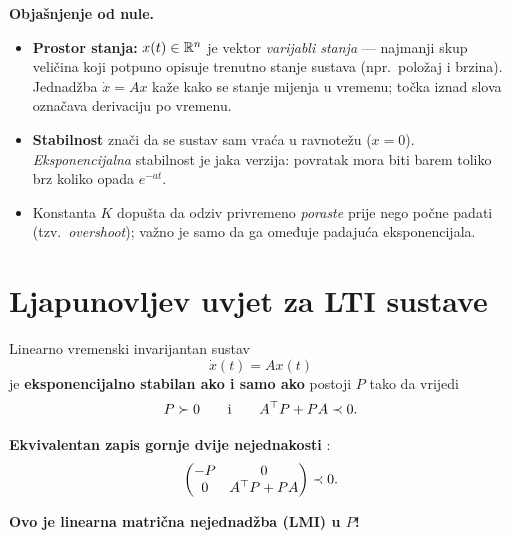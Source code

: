 \textbf{Objašnjenje od nule.}

\begin{itemize}
  \item \textbf{Prostor stanja:} $x(t) \in \mathbb{R}^n$ je vektor \emph{varijabli
        stanja} --- najmanji skup veličina koji potpuno opisuje trenutno stanje
        sustava (npr.\ položaj i brzina). Jednadžba $\dot x = Ax$ kaže kako se
        stanje mijenja u vremenu; točka iznad slova označava derivaciju po
        vremenu.
  \item \textbf{Stabilnost} znači da se sustav sam vraća u ravnotežu
        ($x = 0$). \emph{Eksponencijalna} stabilnost je jaka verzija: povratak
        mora biti barem toliko brz koliko opada $e^{-at}$.
  \item Konstanta $K$ dopušta da odziv privremeno \emph{poraste} prije nego
        počne padati (tzv.\ \emph{overshoot}); važno je samo da ga omeđuje
        padajuća eksponencijala.
\end{itemize}

\section{Ljapunovljev uvjet za LTI sustave}
\label{sec:ljapunov}

\begin{teorem}
Linearno vremenski invarijantan sustav
\[
\dot x(t) = Ax(t)
\]
je \textbf{eksponencijalno stabilan ako i samo ako} postoji $P$ tako da vrijedi
\begin{equation}
\label{eq:ljapunov}
P \succ 0 \qquad\text{i}\qquad A^{\top} P + PA \prec 0.
\end{equation}
\end{teorem}

\textbf{Ekvivalentan zapis gornje dvije nejednakosti} :
\[
\begin{pmatrix} -P & 0 \\ 0 & A^{\top} P + PA \end{pmatrix} \prec 0.
\]

\textbf{Ovo je linearna matrična nejednadžba (LMI) u $P$!}

